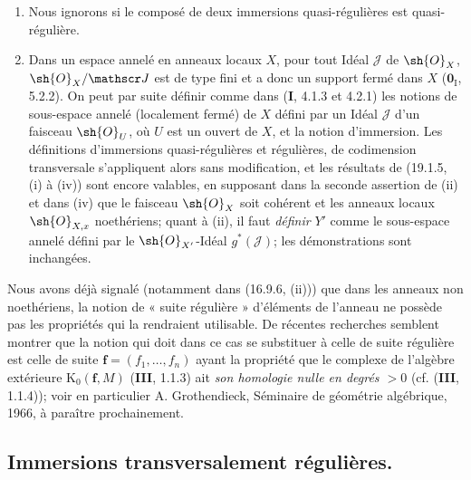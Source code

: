 \begin{remarks}[19.1.7]
\label{IV.19.1.7}
\begin{enumerate}
  \item[(i)] Nous ignorons si le composé de deux immersions quasi-régulières est quasi-régulière.
  \item[(ii)] Dans un espace annelé en anneaux locaux $X$, pour tout Idéal $\mathscr J$ de $\sh{O}_X$, $\sh{O}_X/\mathscr J$ est de type fini et a donc un support fermé dans $X$ ($\mathbf{0}_{\mathrm I}$, 5.2.2). On peut par suite définir comme dans (\textbf{I}, 4.1.3 et 4.2.1) les notions de sous-espace annelé (localement fermé) de $X$ défini par un Idéal $\mathscr J$ d'un faisceau $\sh{O}_U$, où $U$ est un ouvert de $X$, et la notion d'immersion. Les définitions d'immersions quasi-régulières et régulières, de codimension transversale s'appliquent alors sans modification, et les résultats de (19.1.5, (i) à (iv)) sont encore valables, en supposant dans la seconde assertion de (ii) et dans (iv) que le faisceau $\sh{O}_X$ soit cohérent et les anneaux locaux $\sh{O}_{X,x}$ noethériens; quant à (ii), il faut \emph{définir} $Y'$ comme le sous-espace annelé défini par le $\sh{O}_{X'}$-Idéal $g^*(\mathscr J)$; les démonstrations sont inchangées.
\end{enumerate}
\end{remarks}

\begin{env}[19.1.8]
\label{IV.19.1.8}
Nous avons déjà signalé (notamment dans (16.9.6, (ii))) que dans les anneaux non noethériens, la notion de « suite régulière » d'éléments de l'anneau ne possède pas les propriétés qui la rendraient utilisable. De récentes recherches semblent montrer que la notion qui doit dans ce cas se substituer à celle de suite régulière est celle de suite $\mathbf f=(f_1,\ldots,f_n)$ ayant la propriété que le complexe de l'algèbre extérieure $\mathrm K_0(\mathbf f,M)$ (\textbf{III}, 1.1.3) ait \emph{son homologie nulle en degrés $>0$} (cf. (\textbf{III}, 1.1.4)); voir en particulier A. Grothendieck, Séminaire de géométrie algébrique, 1966, à paraître prochainement.
\end{env}


\subsection{Immersions transversalement régulières.}

